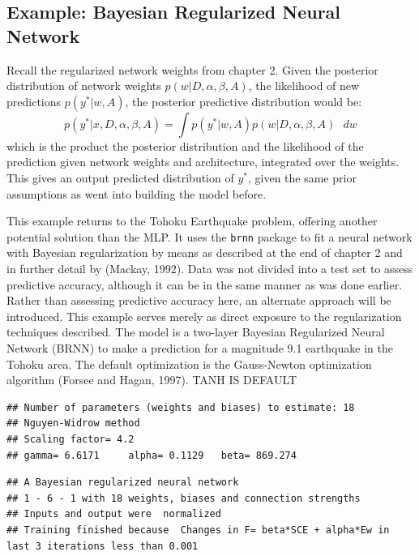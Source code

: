 \subsection{Example: Bayesian Regularized Neural Network}

Recall the regularized network weights from chapter 2. Given the posterior distribution of network weights $p(w|D,\alpha,\beta,A)$, the likelihood of new predictions $p(y^*|w,A)$, the posterior predictive distribution would be:
$$
p(y^*|x,D,\alpha,\beta,A) = \int p(y^*|w,A) p(w|D,\alpha,\beta,A) \text{ } dw
$$
which is the product the posterior distribution and the likelihood of the prediction given network weights and architecture, integrated over the weights.  This gives an output predicted distribution of $y^*$, given the same prior assumptions as went into building the model before.

This example returns to the Tohoku Earthquake problem, offering another potential solution than the MLP.  It uses the \texttt{brnn} package \cite{brnn} to fit a neural network with Bayesian regularization by means as described at the end of chapter 2 and in further detail by (Mackay, 1992).  Data was not divided into a test set to assess predictive accuracy, although it can be in the same manner as was done earlier.  Rather than assessing predictive accuracy here, an alternate approach will be introduced.  This example serves merely as direct exposure to the regularization techniques described.
The model is a two-layer Bayesian Regularized Neural Network (BRNN) to make a prediction for a magnitude 9.1 earthquake in the Tohoku area. %
The default optimization is the Gauss-Newton optimization algorithm (Forsee and Hagan, 1997).
TANH IS DEFAULT

\begin{verbatim}
## Number of parameters (weights and biases) to estimate: 18 
## Nguyen-Widrow method
## Scaling factor= 4.2 
## gamma= 6.6171     alpha= 0.1129   beta= 869.274
\end{verbatim}

\begin{verbatim}
## A Bayesian regularized neural network 
## 1 - 6 - 1 with 18 weights, biases and connection strengths
## Inputs and output were  normalized
## Training finished because  Changes in F= beta*SCE + alpha*Ew in last 3 iterations less than 0.001
\end{verbatim}


